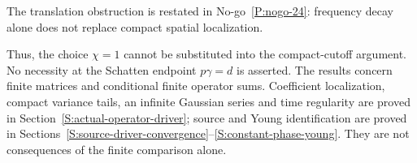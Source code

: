 The translation obstruction is restated in No-go~\ref{P:nogo-24}:
frequency decay alone does not replace compact spatial localization.


Thus, the choice $\chi = 1$ cannot be substituted into the compact-cutoff
argument. No necessity at the Schatten endpoint $p\gamma = d$ is asserted. The
results concern finite matrices and conditional finite operator sums.
Coefficient localization, compact variance tails, an infinite Gaussian series
and time regularity are proved in Section~\ref{S:actual-operator-driver}; source
and Young identification are proved in
Sections~\ref{S:source-driver-convergence}--\ref{S:constant-phase-young}. They
are not consequences of the finite comparison alone.

